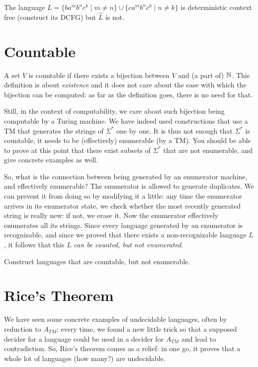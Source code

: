 \begin{example}
The language $L = \{ba^mb^nc^k\mid m \neq n\} \cup \{ca^mb^nc^k\mid n \neq k\}$ is
deterministic context free (construct its DCFG) but $\widehat{L}$ is
not.
\end{example}

\section{Countable}

A set $V$ is countable if there exists a bijection between $V$ and (a
part of) $\mathbb{N}$. This definition is about {\em existence} and it does
not care about the ease with which the bijection can be computed: as
far as the definition goes, there is no need for that.

Still, in the context of computability, we care about such bijection
being computable by a Turing machine. We have indeed used
constructions that use a TM that generates the strings of $\Sigma^*$
one by one. It is thus not enough that $\Sigma^*$ is countable, it
needs to be (effectively) enumerable (by a TM). You should be able to prove at
this point that there exist subsets of $\Sigma^*$ that are
not enumerable, and give concrete examples as well.

So, what is the connection between being generated by an enumerator
machine, and effectively enumerable? The enumerator is allowed to
generate duplicates. We can prevent it from doing so by modifying it a
little: any time the enumerator arrives in its enumerator state, we
check whether the most recently generated string is really new: if
not, we erase it. Now the enumerator effectively enumerates all its
strings. Since every language generated by an enumerator is recognizable,
and since we proved that there exists a non-recognizable language $L$,
it follows that this $L$ \emph{can be counted, but not enumerated}.
\begin{exercise}
Construct languages that are countable, but not enumerable.
\end{exercise}


\section{Rice's Theorem}

We have seen some concrete examples of undecidable languages, often by
reduction to $A_{TM}$: every time, we found a new little trick so that
a supposed decider for a language could be used in a decider for
$A_{TM}$ and lead to contradiction. So, Rice's theorem comes as a
relief: in one go, it proves that a whole lot of languages (how many?)
are undecidable.

